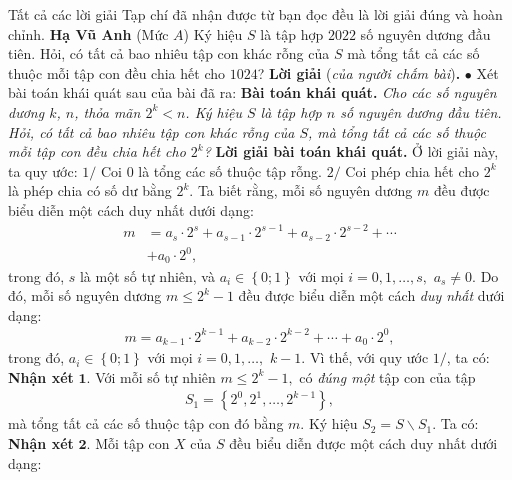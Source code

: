 \begin{multicols}{2}
	\vskip 0.05cm
	Tất cả các lời giải Tạp chí đã nhận được từ bạn đọc đều là lời giải đúng và hoàn chỉnh.
	\vskip 0.05cm
	\hfill	\textbf{\color{thachthuctoanhoc}Hạ Vũ Anh}
	\vskip 0.05cm
	{}
	(Mức $A$) Ký hiệu $S$ là tập hợp $2022$ số nguyên dương đầu tiên. Hỏi, có tất cả bao nhiêu tập con khác rỗng của $S$ mà tổng tất cả các số thuộc mỗi tập con đều chia hết cho $1024$?
	\vskip 0.05cm
	\textbf{\color{thachthuctoanhoc}Lời giải} (\textit{của người chấm bài})\textbf{\color{thachthuctoanhoc}.}
	\vskip 0.05cm
	$\bullet$ Xét bài toán khái quát sau của bài đã ra:
	\vskip 0.05cm
	\textbf{\color{thachthuctoanhoc}Bài toán khái quát.} \textit{Cho các số nguyên dương $k$, $n$, thỏa mãn $2^k < n$. Ký hiệu $S$ là tập hợp $n$ số nguyên dương đầu tiên. Hỏi, có tất cả bao nhiêu tập con khác rỗng của $S$, mà tổng tất cả các số thuộc mỗi tập con đều chia hết cho  $2^k$?}
	\vskip 0.05cm
	\textbf{\color{thachthuctoanhoc}Lời giải bài toán khái quát.}
	\vskip 0.05cm
	Ở lời giải này, ta quy ước:
	\vskip 0.05cm
	$1/$ Coi $0$ là tổng các số thuộc tập rỗng.
	\vskip 0.05cm
	$2/$ Coi phép chia hết cho $2^k$  là phép chia có số dư bằng  $2^k$.
	\vskip 0.05cm
	Ta biết rằng, mỗi số nguyên dương $m$ đều được biểu diễn một cách duy nhất dưới dạng:
	\begin{align*}
		m &= {a_s} \cdot {2^s} + {a_{s - 1}} \cdot {2^{s - 1}} + {a_{s - 2}} \cdot {2^{s - 2}} +  \cdots  \\
		&+ {a_0} \cdot {2^0},
	\end{align*}
	trong đó, $s$ là một số tự nhiên, và  ${a_i} \in \left\{ {0;1} \right\}$ với mọi  $i = 0,1, \ldots ,s, $ ${a_s} \ne 0.$
	\vskip 0.05cm  
	Do đó, mỗi số nguyên dương  $m \le {2^k} - 1$ đều được biểu diễn một cách \textit{duy nhất} dưới dạng:
	\begin{align*}
		m = {a_{k - 1}} \cdot {2^{k - 1}} + {a_{k - 2}} \cdot {2^{k - 2}} +  \cdots  + {a_0} \cdot {2^0},
	\end{align*}
	trong đó, ${a_i} \in \left\{ {0;1} \right\}$  với mọi  $i = 0,1, \ldots,$ $k - 1$.
	\vskip 0.05cm
	Vì thế, với quy ước $1/$, ta có:
	\vskip 0.05cm
	\textbf{\color{thachthuctoanhoc}Nhận xét} $\pmb{1.}$ Với mỗi số tự nhiên $m \le {2^k} - 1,$  có \textit{đúng một} tập con của tập
	\begin{align*}
		{S_1} = \left\{ {{2^0},{2^1}, \ldots ,{2^{k - 1}}} \right\},
	\end{align*}
	mà tổng tất cả các số thuộc tập con đó bằng  $m$.
	\vskip 0.05cm
	Ký hiệu ${S_2} = S \backslash {S_1}$.  Ta có:
	\vskip 0.05cm
	\textbf{\color{thachthuctoanhoc}Nhận xét} $\pmb{2.}$ Mỗi tập con $X$ của $S$ đều biểu diễn được một cách duy nhất dưới dạng:

\end{multicols}
